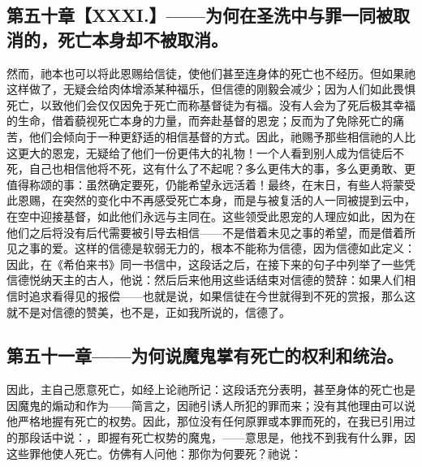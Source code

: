 
\subsection{第五十章【XXXI.】——为何在圣洗中与罪一同被取消的，死亡本身却不被取消。}

然而，祂本也可以将此恩赐给信徒，使他们甚至连身体的死亡也不经历。但如果祂这样做了，无疑会给肉体增添某种福乐，但信德的刚毅会减少；因为人们如此畏惧死亡，以致他们会仅仅因免于死亡而称基督徒为有福。没有人会为了死后极其幸福的生命，借着藐视死亡本身的力量，而奔赴基督的恩宠；反而为了免除死亡的痛苦，他们会倾向于一种更舒适的相信基督的方式。因此，祂赐予那些相信祂的人比这更大的恩宠，无疑给了他们一份更伟大的礼物！一个人看到别人成为信徒后不死，自己也相信他将不死，这有什么了不起呢？多么更伟大的事，多么更勇敢、更值得称颂的事：虽然确定要死，仍能希望永远活着！最终，在末日，有些人将蒙受此恩赐，在突然的变化中不再感受死亡本身，而是与被复活的人一同被提到云中，在空中迎接基督，如此他们永远与主同在。这些领受此恩宠的人理应如此，因为在他们之后将没有后代需要被引导去相信——不是借着未见之事的希望，而是借着所见之事的爱。这样的信德是软弱无力的，根本不能称为信德，因为信德如此定义：因此，在《希伯来书》同一书信中，这段话之后，在接下来的句子中列举了一些凭信德悦纳天主的古人，他说：然后后来他用这些话结束对信德的赞辞：如果人们相信时追求看得见的报偿——也就是说，如果信徒在今世就得到不死的赏报，那么这就不是对信德的赞美，也不是，正如我所说的，信德了。\par


\subsection{第五十一章——为何说魔鬼掌有死亡的权利和统治。}

因此，主自己愿意死亡，如经上论祂所记：这段话充分表明，甚至身体的死亡也是因魔鬼的煽动和作为——简言之，因祂引诱人所犯的罪而来；没有其他理由可以说他严格地握有死亡的权势。因此，那位没有任何原罪或本罪而死的，在我已引用过的那段话中说：，即握有死亡权势的魔鬼，——意思是，他找不到我有什么罪，因这些罪他使人死亡。仿佛有人问他：那你为何要死？祂说：\par

